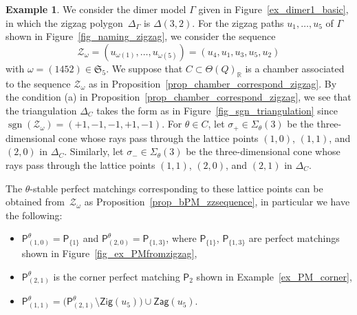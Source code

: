 \documentclass[10pt,a4paper]{amsart}
\numberwithin{equation}{section}
\theoremstyle{definition}
\newtheorem{Example}[Theorem]{Example}
\newcommand{\RR}{\mathbb{R}}
\newcommand{\calZ}{\mathcal{Z}}
\newcommand{\fkS}{\mathfrak{S}}
\newcommand{\sfP}{\mathsf{P}}
\newcommand{\sgn}{\operatorname{sgn}}
\newcommand{\Zig}{\mathsf{Zig}}
\newcommand{\Zag}{\mathsf{Zag}}
\newcommand{\permII}{\omega}
\begin{document}
\begin{Example}
We consider the dimer model $\Gamma$ given in Figure~\ref{ex_dimer1_basic}, in which the zigzag polygon~$\Delta_\Gamma$ is $\Delta(3,2)$.
For the zigzag paths $u_1, \dots, u_5$ of $\Gamma$ shown in Figure~\ref{fig_naming_zigzag},
we consider the sequence
\[
\calZ_\permII=(u_{\permII(1)}, \dots, u_{\permII(5)})=(u_4,u_1,u_3,u_5,u_2)
\]
with $\permII=(1452)\in\fkS_5$. We suppose that $C\subset\Theta(Q)_\RR$ is a chamber associated to the sequence $\calZ_\permII$ as in Proposition~\ref{prop_chamber_correspond_zigzag}.
By the condition (a) in Proposition~\ref{prop_chamber_correspond_zigzag},
we see that the triangulation $\Delta_C$ takes the form as in Figure~\ref{fig_sgn_triangulation} since $\sgn(\calZ_\permII)=(+1,-1,-1,+1,-1)$.
For $\theta\in C$, let $\sigma_+\in\Sigma_\theta(3)$ be the three-dimensional cone
whose rays pass through the lattice points $(1,0)$, $(1,1)$, and $(2,0)$ in $\Delta_C$.
Similarly, let $\sigma_-\in\Sigma_\theta(3)$ be the three-dimensional cone
whose rays pass through the lattice points $(1,1)$, $(2,0)$, and $(2,1)$ in $\Delta_C$.

\begin{center}
{}
\end{center}

The $\theta$-stable perfect matchings corresponding to these lattice points can be obtained from~$\calZ_\permII$ as Proposition~\ref{prop_bPM_zzsequence}, in particular we have the following:
\begin{itemize}\itemsep=0pt
\item $\sfP^\theta_{(1,0)}=\sfP_{\{1\}}$ and $\sfP^\theta_{(2,0)}=\sfP_{\{1,3\}}$, where $\sfP_{\{1\}}$, $\sfP_{\{1,3\}}$ are perfect matchings shown in Fig\-ure~\ref{fig_ex_PMfromzigzag},
\item $\sfP^\theta_{(2,1)}$ is the corner perfect matching $\sfP_2$ shown in Example~\ref{ex_PM_corner},
\item $\sfP^\theta_{(1,1)}=\big(\sfP^\theta_{(2,1)}{\setminus}\Zig(u_5)\big)\cup\Zag(u_5)$.
\end{itemize}


\end{Example}
\end{document}
